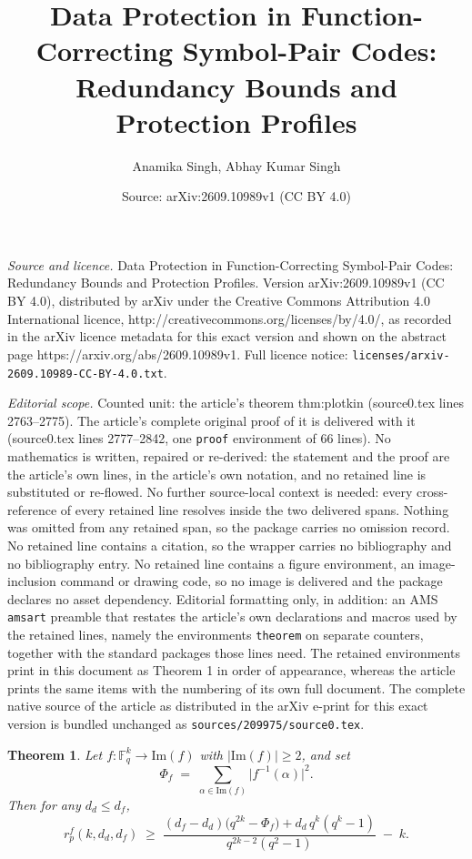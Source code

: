 \documentclass[10pt,a4paper]{amsart}
\title{Data Protection in Function-Correcting Symbol-Pair Codes: Redundancy Bounds and Protection Profiles}
\author{Anamika Singh, Abhay Kumar Singh}
\date{Source: arXiv:2609.10989v1 (CC BY 4.0)}
\newtheorem{theorem}{Theorem}
\begin{document}
\maketitle

\noindent\emph{Source and licence.} Data Protection in Function-Correcting Symbol-Pair Codes: Redundancy Bounds and Protection Profiles. Version arXiv:2609.10989v1 (CC BY 4.0), distributed by arXiv under the Creative Commons Attribution 4.0 International licence, http://creativecommons.org/licenses/by/4.0/, as recorded in the arXiv licence metadata for this exact version and shown on the abstract page https://arxiv.org/abs/2609.10989v1. Full licence notice: \texttt{licenses/arxiv-2609.10989-CC-BY-4.0.txt}.\par\smallskip

\noindent\textit{Editorial scope.} Counted unit: the article's theorem thm:plotkin (source0.tex lines 2763--2775). The article's complete original proof of it is delivered with it (source0.tex lines 2777--2842, one \texttt{proof} environment of 66 lines). No mathematics is written, repaired or re-derived: the statement and the proof are the article's own lines, in the article's own notation, and no retained line is substituted or re-flowed.  No further source-local context is needed: every cross-reference of every retained line resolves inside the two delivered spans.  Nothing was omitted from any retained span, so the package carries no omission record.  No retained line contains a citation, so the wrapper carries no bibliography and no bibliography entry.  No retained line contains a figure environment, an image-inclusion command or drawing code, so no image is delivered and the package declares no asset dependency.  Editorial formatting only, in addition: an AMS \texttt{amsart} preamble that restates the article's own declarations and macros used by the retained lines, namely the environments \texttt{theorem} on separate counters, together with the standard packages those lines need.  The retained environments print in this document as Theorem 1 in order of appearance, whereas the article prints the same items with the numbering of its own full document.  The complete native source of the article as distributed in the arXiv e-print for this exact version is bundled unchanged as \texttt{sources/209975/source0.tex}.
    \begin{theorem}
    \label{thm:plotkin}
    Let $f : \mathbb{F}_q^{k} \to \mathrm{Im}(f)$ with $|\mathrm{Im}(f)| \ge 2$, and set
    \[
    \Phi_f \;=\; \sum_{\alpha \in \mathrm{Im}(f)} \bigl|f^{-1}(\alpha)\bigr|^{2}.
    \]
    Then for any $d_d \le d_f$,
    \[
    r_p^f(k,d_d,d_f) \;\ge\;
    \frac{(d_f-d_d)\bigl(q^{2k}-\Phi_f\bigr) + d_d\,q^{k}(q^{k}-1)}
         {q^{2k-2}(q^{2}-1)} \;-\; k .
    \]
\end{theorem}
\end{document}
